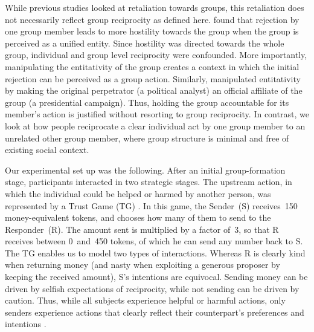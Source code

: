 \documentclass[12pt,a4paper]{article}\usepackage[]{graphicx}\usepackage[]{color}
\begin{document}

While previous studies looked at retaliation towards groups, this retaliation does not necessarily reflect group reciprocity as defined here. \citet{gaertner2008whenrejection} found that rejection by one group member leads to more hostility towards the group when the group is perceived as a unified entity. Since hostility was directed towards the whole group, individual and group level reciprocity were confounded. More importantly, manipulating the entitativity of the group creates a context in which the initial rejection can be perceived as a group action. %
Similarly, \citet{stenstrom2008theroles} manipulated entitativity by making the original perpetrator (a political analyst) an official affiliate of the group (a presidential campaign). Thus, holding the group accountable for its member's action is justified without resorting to group reciprocity. In contrast, we look at how people reciprocate a clear individual act by one group member to an unrelated other group member, where group structure is minimal and free of existing social context. 


Our experimental set up was the following. After an initial group-formation stage, participants interacted in two strategic stages. The upstream action, in which the individual could be helped  or harmed by another person, was represented by a Trust Game (TG) \citep{berg1995trust}.  In this game, the Sender~(S) receives~150 money-equivalent tokens, and chooses how many of them to send to the Responder~(R). The amount sent is multiplied by a factor of~3, so that R receives between 0~and~450 tokens, of which he can send any number back to S. The TG enables us to model two types of interactions. Whereas R is clearly kind when returning money (and nasty when exploiting a generous proposer by keeping the received amount), S's intentions are equivocal. Sending money can be driven by selfish expectations of reciprocity, while not sending can be driven by caution. Thus, while all subjects experience helpful or harmful actions, only senders experience actions that clearly reflect their counterpart's preferences and intentions \citep{gunnthorsdottir2002using,kimbrough2015norms}.
\end{document}
